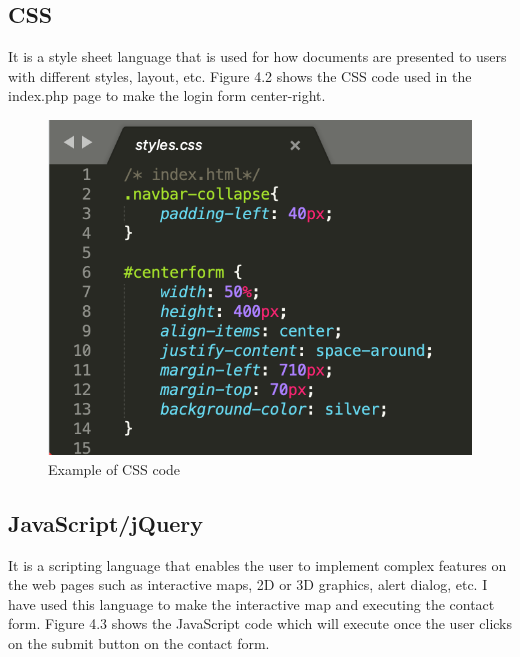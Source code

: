\subsection{CSS}
It is a style sheet language that is used for how documents are presented to users with different styles, layout, etc. Figure 4.2 shows the CSS code used in the index.php page to make the login form center-right.

\begin{figure}[H]
\centering
    \includegraphics[scale=0.56]
    {implement_image/css.png}
    \caption{Example of CSS code}
    \label{fig:Example of CSS code}
\end{figure}

\subsection{JavaScript/jQuery}
It is a scripting language that enables the user to implement complex features on the web pages such as interactive maps, 2D or 3D graphics, alert dialog, etc. I have used this language to make the interactive map and executing the contact form. Figure 4.3 shows the JavaScript code which will execute once the user clicks on the submit button on the contact form.

